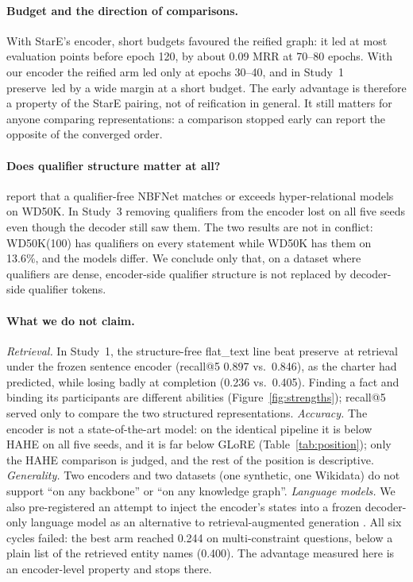 \documentclass[11pt,a4paper]{article}
\newcommand{\hyper}{\textsf{preserve}}
\begin{document}
\paragraph{Budget and the direction of comparisons.}
With StarE's encoder, short budgets favoured the reified graph: it led at most evaluation points before epoch 120, by about 0.09 MRR at 70--80 epochs. With our encoder the reified arm led only at epochs 30--40, and in Study~1 \hyper\ led by a wide margin at a short budget. The early advantage is therefore a property of the StarE pairing, not of reification in general. It still matters for anyone comparing representations: a comparison stopped early can report the opposite of the converged order.

\paragraph{Does qualifier structure matter at all?}
\citet{wang2025understanding} report that a qualifier-free NBFNet matches or exceeds hyper-relational models on WD50K. In Study~3 removing qualifiers from the encoder lost on all five seeds even though the decoder still saw them. The two results are not in conflict: WD50K(100) has qualifiers on every statement while WD50K has them on 13.6\%, and the models differ. We conclude only that, on a dataset where qualifiers are dense, encoder-side qualifier structure is not replaced by decoder-side qualifier tokens.

\paragraph{What we do not claim.}
\emph{Retrieval.} In Study~1, the structure-free \textsf{flat\_text} line beat \hyper\ at retrieval under the frozen sentence encoder (recall@5 0.897 vs.\ 0.846), as the charter had predicted, while losing badly at completion (0.236 vs.\ 0.405). Finding a fact and binding its participants are different abilities (Figure~\ref{fig:strengths}); recall@5 served only to compare the two structured representations. \emph{Accuracy.} The encoder is not a state-of-the-art model: on the identical pipeline it is below HAHE on all five seeds, and it is far below GLoRE (Table~\ref{tab:position}); only the HAHE comparison is judged, and the rest of the position is descriptive. \emph{Generality.} Two encoders and two datasets (one synthetic, one Wikidata) do not support ``on any backbone'' or ``on any knowledge graph''. \emph{Language models.} We also pre-registered an attempt to inject the encoder's states into a frozen decoder-only language model \citep{qwen2024} as an alternative to retrieval-augmented generation \citep{lewis2020rag}. All six cycles failed: the best arm reached 0.244 on multi-constraint questions, below a plain list of the retrieved entity names (0.400). The advantage measured here is an encoder-level property and stops there.
\end{document}
